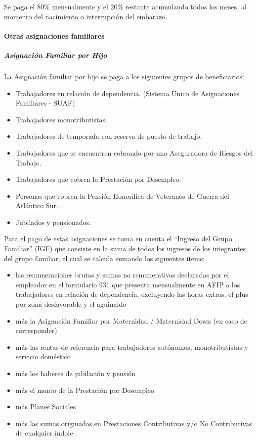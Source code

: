 \documentclass[
  12,
]{article}
\providecommand{\tightlist}{%
  \setlength{\itemsep}{0pt}\setlength{\parskip}{0pt}}
\begin{document}
Se paga el 80\% mensualmente y el 20\% restante acumulando todos los
meses, al momento del nacimiento o interrupción del embarazo.

\hypertarget{otras-asignaciones-familiares}{%
\paragraph{Otras asignaciones
familiares}\label{otras-asignaciones-familiares}}

\hypertarget{asignaciuxf3n-familiar-por-hijo}{%
\subparagraph{Asignación Familiar por
Hijo}\label{asignaciuxf3n-familiar-por-hijo}}

La Asignación familiar por hijo se paga a los siguientes grupos de
beneficiarios:

\begin{itemize}
\tightlist
\item
  Trabajadores en relación de dependencia. (Sistema Único de
  Asignaciones Familiares - SUAF)
\item
  Trabajadores monotributistas.
\item
  Trabajadores de temporada con reserva de puesto de trabajo.
\item
  Trabajadores que se encuentren cobrando por una Aseguradora de Riesgos
  del Trabajo.
\item
  Trabajadores que cobren la Prestación por Desempleo.
\item
  Personas que cobren la Pensión Honorífica de Veteranos de Guerra del
  Atlántico Sur.
\item
  Jubilados y pensionados.
\end{itemize}

Para el pago de estas asignaciones se toma en cuenta el ``Ingreso del
Grupo Familiar'' (IGF) que consiste en la suma de todos los ingresos de
los integrantes del grupo familiar, el cual se calcula sumando los
siguientes ítems:

\begin{itemize}
\tightlist
\item
  las remuneraciones brutas y sumas no remunerativas declaradas por el
  empleador en el formulario 931 que presenta mensualmente en AFIP a los
  trabajadores en relación de dependencia, excluyendo las horas extras,
  el plus por zona desfavorable y el aguinaldo
\item
  más la Asignación Familiar por Maternidad / Maternidad Down (en caso
  de corresponder)
\item
  más las rentas de referencia para trabajadores autónomos,
  monotributistas y servicio doméstico
\item
  más los haberes de jubilación y pensión
\item
  más el monto de la Prestación por Desempleo
\item
  más Planes Sociales
\item
  más las sumas originadas en Prestaciones Contributivas y/o No
  Contributivas de cualquier índole
\end{itemize}
\end{document}
